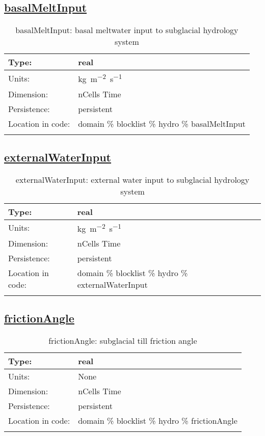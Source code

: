 \subsection[basalMeltInput]{\hyperref[sec:var_tab_hydro]{basalMeltInput}}
\label{subsec:var_sec_hydro_basalMeltInput}
\begin{center}
\begin{longtable}{| p{2.0in} | p{4.0in} |}
        \hline 
        Type: & real \\
        \hline 
        Units: & \si{kg.m^{-2}.s^{-1}} \\
        \hline 
        Dimension: & nCells Time \\
        \hline 
        Persistence: & persistent \\
        \hline 
         Location in code: & domain \% blocklist \% hydro \% basalMeltInput \\
         \hline 
    \caption{basalMeltInput: basal meltwater input to subglacial hydrology system}
\end{longtable}
\end{center}
\subsection[externalWaterInput]{\hyperref[sec:var_tab_hydro]{externalWaterInput}}
\label{subsec:var_sec_hydro_externalWaterInput}
\begin{center}
\begin{longtable}{| p{2.0in} | p{4.0in} |}
        \hline 
        Type: & real \\
        \hline 
        Units: & \si{kg.m^{-2}.s^{-1}} \\
        \hline 
        Dimension: & nCells Time \\
        \hline 
        Persistence: & persistent \\
        \hline 
         Location in code: & domain \% blocklist \% hydro \% externalWaterInput \\
         \hline 
    \caption{externalWaterInput: external water input to subglacial hydrology system}
\end{longtable}
\end{center}
\subsection[frictionAngle]{\hyperref[sec:var_tab_hydro]{frictionAngle}}
\label{subsec:var_sec_hydro_frictionAngle}
\begin{center}
\begin{longtable}{| p{2.0in} | p{4.0in} |}
        \hline 
        Type: & real \\
        \hline 
        Units: & \si{None} \\
        \hline 
        Dimension: & nCells Time \\
        \hline 
        Persistence: & persistent \\
        \hline 
         Location in code: & domain \% blocklist \% hydro \% frictionAngle \\
         \hline 
    \caption{frictionAngle: subglacial till friction angle}
\end{longtable}
\end{center}
